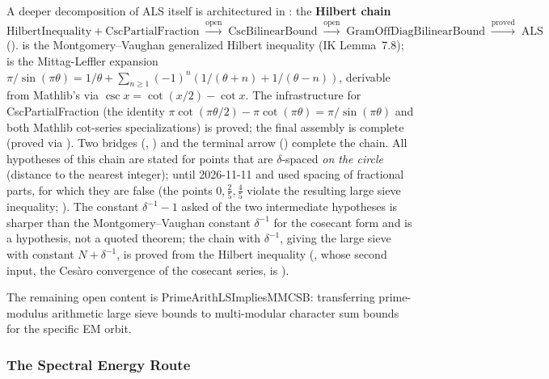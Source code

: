A deeper decomposition of ALS itself is architectured in
: the \textbf{Hilbert chain}
\[
\mathrm{HilbertInequality} + \mathrm{CscPartialFraction}
\;\xrightarrow{\text{open}}\;
\mathrm{CscBilinearBound}
\;\xrightarrow{\text{open}}\;
\mathrm{GramOffDiagBilinearBound}
\;\xrightarrow{\text{proved}}\;
\mathrm{ALS}
\]
().
 is the Montgomery--Vaughan
generalized Hilbert inequality (IK Lemma~7.8);
 is the Mittag-Leffler expansion
$\pi/\sin(\pi\theta) = 1/\theta + \sum_{n\geq 1}(-1)^n(1/(\theta{+}n) + 1/(\theta{-}n))$,
derivable from Mathlib's  via $\csc x = \cot(x/2) - \cot x$.
The infrastructure for CscPartialFraction (the identity
$\pi\cot(\pi\theta/2) - \pi\cot(\pi\theta) = \pi/\sin(\pi\theta)$
and both Mathlib cot-series specializations) is proved; the final
 assembly is complete (proved via
).
Two bridges (,
) and the terminal arrow
() complete the chain.
All hypotheses of this chain are stated for points that are
$\delta$-spaced \emph{on the circle} (distance to the nearest integer);
until 2026-11-11  and
 used spacing of fractional parts, for
which they are false (the points $0, \tfrac25, \tfrac45$ violate the
resulting large sieve inequality;
).
The constant $\delta^{-1}-1$ asked of the two intermediate hypotheses is
sharper than the Montgomery--Vaughan constant $\delta^{-1}$ for the
cosecant form and is a hypothesis, not a quoted theorem; the chain with
$\delta^{-1}$, giving the large sieve with constant $N+\delta^{-1}$, is
proved from the Hilbert inequality
(, whose
second input, the Ces\`aro convergence of the cosecant series, is
).

The remaining open content is PrimeArithLSImpliesMMCSB: transferring
prime-modulus arithmetic large sieve bounds to multi-modular character
sum bounds for the specific EM orbit.

\subsubsection*{The Spectral Energy Route}
\label{sec:sve}

